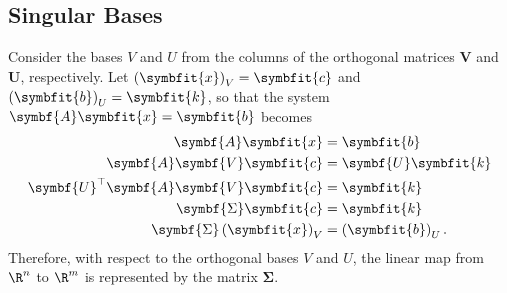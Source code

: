 \documentclass{article}
\begin{document}
\begin{multicols*}{3}
    \subsection{Singular Bases}
    Consider the bases \(V\) and \(U\) from the columns of the orthogonal matrices \(\symbf{V}\) and \(\symbf{U}\), respectively.
    Let \(\left( \symbfit{x} \right)_V = \symbfit{c}\) and \(\left( \symbfit{b} \right)_U = \symbfit{k}\),
    so that the system \(\symbf{A} \symbfit{x} = \symbfit{b}\) becomes
    \begin{align*}
        \symbf{A} \symbfit{x}                          & = \symbfit{b}                   \\
        \symbf{A} \symbf{V} \symbfit{c}                & = \symbf{U} \symbfit{k}         \\
        \symbf{U}^\top \symbf{A} \symbf{V} \symbfit{c} & = \symbfit{k}                   \\
        \symbf{\Sigma} \symbfit{c}                     & = \symbfit{k}                   \\
        \symbf{\Sigma} \left( \symbfit{x} \right)_V    & = \left( \symbfit{b} \right)_U.
    \end{align*}
    Therefore, with respect to the orthogonal bases \(V\) and \(U\), the linear map from \(\R^n\) to \(\R^m\) is represented
    by the matrix \(\symbf{\Sigma}\).

\end{multicols*}
\end{document}
